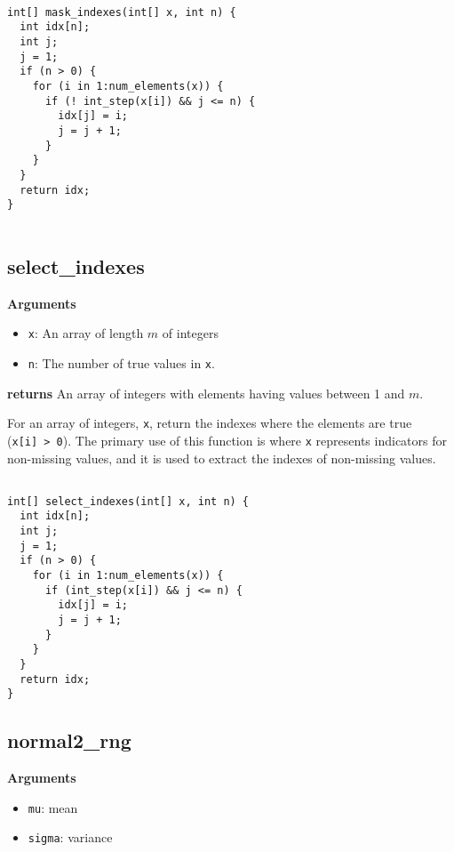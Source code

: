 \documentclass[]{book}
\providecommand{\tightlist}{%
  \setlength{\itemsep}{0pt}\setlength{\parskip}{0pt}}
\begin{document}
\begin{verbatim}

int[] mask_indexes(int[] x, int n) {
  int idx[n];
  int j;
  j = 1;
  if (n > 0) {
    for (i in 1:num_elements(x)) {
      if (! int_step(x[i]) && j <= n) {
        idx[j] = i;
        j = j + 1;
      }
    }
  }
  return idx;
}


\end{verbatim}

\subsection{select\_indexes}\label{select_indexes}

\textbf{Arguments}

\begin{itemize}
\tightlist
\item
  \texttt{x}: An array of length \(m\) of integers
\item
  \texttt{n}: The number of true values in \texttt{x}.
\end{itemize}

\textbf{returns} An array of integers with elements having values
between 1 and \(m\).

For an array of integers, \texttt{x}, return the indexes where the
elements are true (\texttt{x{[}i{]}\ \textgreater{}\ 0}). The primary
use of this function is where \texttt{x} represents indicators for
non-missing values, and it is used to extract the indexes of non-missing
values.

\begin{verbatim}

int[] select_indexes(int[] x, int n) {
  int idx[n];
  int j;
  j = 1;
  if (n > 0) {
    for (i in 1:num_elements(x)) {
      if (int_step(x[i]) && j <= n) {
        idx[j] = i;
        j = j + 1;
      }
    }
  }
  return idx;
}

\end{verbatim}

\subsection{normal2\_rng}\label{normal2_rng}

\textbf{Arguments}

\begin{itemize}
\tightlist
\item
  \texttt{mu}: mean
\item
  \texttt{sigma}: variance
\end{itemize}
\end{document}
